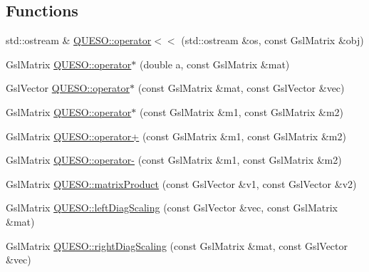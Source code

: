 \subsection*{Functions}
\begin{DoxyCompactItemize}
\item 
std\-::ostream \& \hyperlink{namespace_q_u_e_s_o_acf137d0e0d62509c7abc70f1f0f799ef}{Q\-U\-E\-S\-O\-::operator$<$$<$} (std\-::ostream \&os, const Gsl\-Matrix \&obj)
\item 
Gsl\-Matrix \hyperlink{namespace_q_u_e_s_o_a1fa0d79f37a4fccc4c307456d29c4bfa}{Q\-U\-E\-S\-O\-::operator$\ast$} (double a, const Gsl\-Matrix \&mat)
\item 
Gsl\-Vector \hyperlink{namespace_q_u_e_s_o_a87c02837d212969d66ae52ac73d0e301}{Q\-U\-E\-S\-O\-::operator$\ast$} (const Gsl\-Matrix \&mat, const Gsl\-Vector \&vec)
\item 
Gsl\-Matrix \hyperlink{namespace_q_u_e_s_o_a511d0179f61e084b7574c97affcbd723}{Q\-U\-E\-S\-O\-::operator$\ast$} (const Gsl\-Matrix \&m1, const Gsl\-Matrix \&m2)
\item 
Gsl\-Matrix \hyperlink{namespace_q_u_e_s_o_a299d5db0d04a1d1a943b292585d01ad9}{Q\-U\-E\-S\-O\-::operator+} (const Gsl\-Matrix \&m1, const Gsl\-Matrix \&m2)
\item 
Gsl\-Matrix \hyperlink{namespace_q_u_e_s_o_a07502ec763e41daf33325dfbda9b0102}{Q\-U\-E\-S\-O\-::operator-\/} (const Gsl\-Matrix \&m1, const Gsl\-Matrix \&m2)
\item 
Gsl\-Matrix \hyperlink{namespace_q_u_e_s_o_aea04e232d5d3dd76349a85bb8acf9e17}{Q\-U\-E\-S\-O\-::matrix\-Product} (const Gsl\-Vector \&v1, const Gsl\-Vector \&v2)
\item 
Gsl\-Matrix \hyperlink{namespace_q_u_e_s_o_a0d18267f571a86516c0d9960b1a0f1c9}{Q\-U\-E\-S\-O\-::left\-Diag\-Scaling} (const Gsl\-Vector \&vec, const Gsl\-Matrix \&mat)
\item 
Gsl\-Matrix \hyperlink{namespace_q_u_e_s_o_a2c87d8c1ab55355226086522f9fb7f83}{Q\-U\-E\-S\-O\-::right\-Diag\-Scaling} (const Gsl\-Matrix \&mat, const Gsl\-Vector \&vec)
\end{DoxyCompactItemize}
